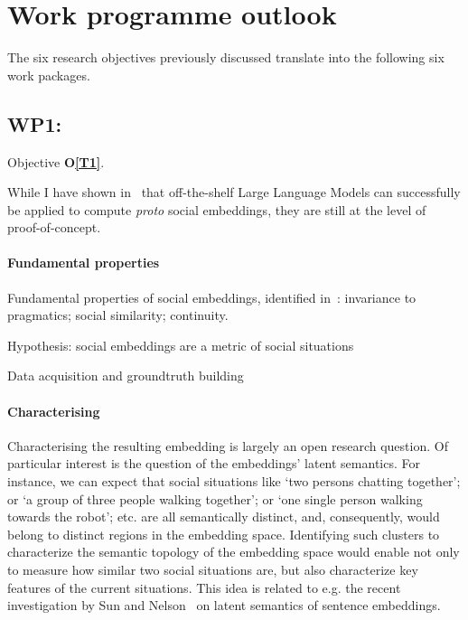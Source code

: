 
\section{Work programme outlook}





The six research objectives previously discussed translate into the following
six work packages.

\subsection{WP1: \textbf{\wpOne}}

Objective {\bf O\ref{T1}}.

While I have shown in~\cite{lemaignan2024social} that off-the-shelf Large
Language Models can successfully be applied to compute \emph{proto} social
embeddings, they are still at the level of proof-of-concept.


\paragraph{Fundamental properties}

Fundamental properties of social embeddings, identified
in~\cite{lemaignan2024social}: invariance to pragmatics; social similarity;
continuity.

Hypothesis: social embeddings are a metric of social situations

Data acquisition and groundtruth building

\paragraph{Characterising} Characterising the resulting embedding is largely an open research question. Of
particular interest is the question of the embeddings' latent semantics. For
instance, we can expect that social situations like `two persons chatting
together'; or `a group of three people walking together'; or `one single person
walking towards the robot'; etc. are all semantically distinct, and,
consequently, would belong to distinct regions in the embedding space.
Identifying such clusters to characterize the semantic topology of the embedding
space would enable not only to measure how similar two social situations are,
but also characterize key features of the current situations.  This idea is
related to e.g. the recent investigation by Sun and
Nelson~\cite{sun2023topological} on latent semantics of sentence embeddings.

